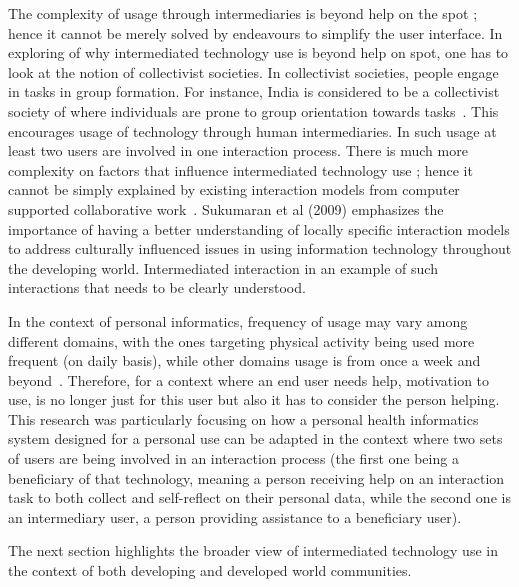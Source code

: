 The complexity of usage through intermediaries is beyond help on the spot \citep{sambasivan2010}; hence it cannot be merely solved by endeavours to simplify the user interface. In exploring of why intermediated technology use is beyond help on spot, one has to look at the notion of collectivist societies. In collectivist societies, people engage in tasks in group formation. For instance, India is considered to be a collectivist society of where individuals are prone to group orientation towards tasks~\citep{parikh2006}. This encourages usage of technology through human intermediaries. In such usage at least two users are involved in one interaction process. There is much more complexity on factors that influence intermediated technology use ; hence it cannot be simply explained by existing interaction models from computer supported collaborative work~\citep{parikh2006}. Sukumaran et al (2009) emphasizes the importance of having a better understanding of locally specific interaction models to address culturally influenced issues in using information technology throughout the developing world. Intermediated interaction in an example of such interactions that needs to be clearly understood.

In the context of personal informatics, frequency of usage may vary among different domains, with the ones targeting physical activity being used more frequent (on daily basis), while other domains usage is from once a week and beyond~\citep{epstein2015lived}. Therefore, for a context where an end user needs help, motivation to use, is no longer just for this user but also it has to consider the person helping. This research was particularly focusing on how a personal health informatics system  designed for a personal use can be adapted in the context where two sets of users are being involved in an interaction process (the first one being a beneficiary of that technology, meaning a person receiving help on an interaction task to both collect and self-reflect on their personal data, while the second one is an intermediary user, a person providing assistance to a beneficiary user). 

The next section highlights the broader view of intermediated technology use in the context of both developing and developed world communities.  

